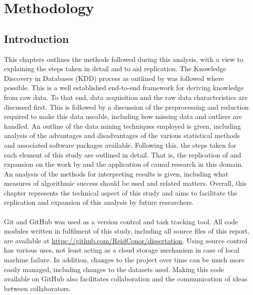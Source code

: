%
%
%
%

\chapter{Methodology}\label{C.Methodology}
\section{Introduction}
{This chapters outlines the methods followed during this analysis, with a view to explaining the steps taken in detail and to aid replication. The Knowledge Discovery in Databases (KDD) process as outlined by \cite{fayyad1996kdd} was followed where possible. This is a well established end-to-end framework for deriving knowledge from raw data. To that end, data acquisition and the raw data characteristics are discussed first. This is followed by a discussion of the preprocessing and reduction required to make this data useable, including how missing data and outliers are handled. An outline of the data mining techniques employed is given, including analysis of the advantages and disadvantages of the various statistical methods and associated software packages available. Following this, the steps taken for each element of this study are outlined in detail. That is, the replication of and expansion on the work by \cite{moldovan2015learning} and the application of causal research in this domain. An analysis of the methods for interpreting results is given, including what measures of algorithmic success should be used and related matters. Overall, this chapter represents the technical aspect of this study and aims to facilitate the replication and expansion of this analysis by future researchers.} \\\\
{Git and GitHub was used as a version control and task tracking tool. All code modules written in fulfilment of this study, including all source files of this report, are available at \url {https://github.com/ReidConor/dissertation}. Using source control has various uses, not least acting as a cloud storage mechanism in case of local machine failure. In addition, changes to the project over time can be much more easily managed, including changes to the datasets used. Making this code available on GitHub also facilitates collaboration and the communication of ideas between collaborators.   }

